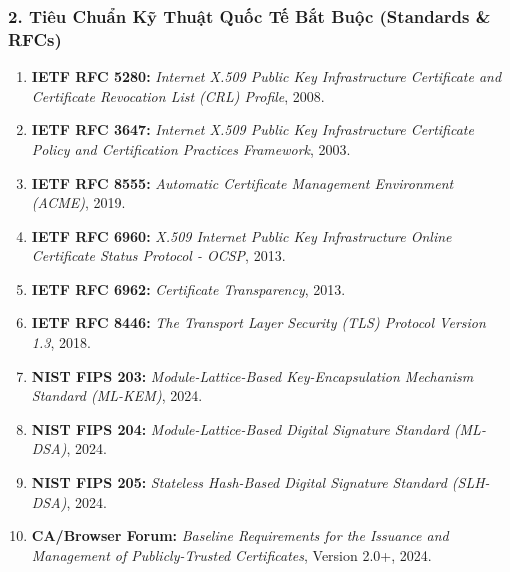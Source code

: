 \documentclass[
]{article}
\providecommand{\tightlist}{%
  \setlength{\itemsep}{0pt}\setlength{\parskip}{0pt}}
\begin{document}
\subsubsection{2. Tiêu Chuẩn Kỹ Thuật Quốc Tế Bắt Buộc (Standards \&
RFCs)}\label{tiuxeau-chuux1ea9n-kux1ef9-thuux1eadt-quux1ed1c-tux1ebf-bux1eaft-buux1ed9c-standards-rfcs}

\begin{enumerate}
\def\labelenumi{\arabic{enumi}.}
\tightlist
\item
  \textbf{IETF RFC 5280:} \emph{Internet X.509 Public Key Infrastructure
  Certificate and Certificate Revocation List (CRL) Profile}, 2008.
\item
  \textbf{IETF RFC 3647:} \emph{Internet X.509 Public Key Infrastructure
  Certificate Policy and Certification Practices Framework}, 2003.
\item
  \textbf{IETF RFC 8555:} \emph{Automatic Certificate Management
  Environment (ACME)}, 2019.
\item
  \textbf{IETF RFC 6960:} \emph{X.509 Internet Public Key Infrastructure
  Online Certificate Status Protocol - OCSP}, 2013.
\item
  \textbf{IETF RFC 6962:} \emph{Certificate Transparency}, 2013.
\item
  \textbf{IETF RFC 8446:} \emph{The Transport Layer Security (TLS)
  Protocol Version 1.3}, 2018.
\item
  \textbf{NIST FIPS 203:} \emph{Module-Lattice-Based Key-Encapsulation
  Mechanism Standard (ML-KEM)}, 2024.
\item
  \textbf{NIST FIPS 204:} \emph{Module-Lattice-Based Digital Signature
  Standard (ML-DSA)}, 2024.
\item
  \textbf{NIST FIPS 205:} \emph{Stateless Hash-Based Digital Signature
  Standard (SLH-DSA)}, 2024.
\item
  \textbf{CA/Browser Forum:} \emph{Baseline Requirements for the
  Issuance and Management of Publicly-Trusted Certificates}, Version
  2.0+, 2024.
\end{enumerate}
\end{document}
